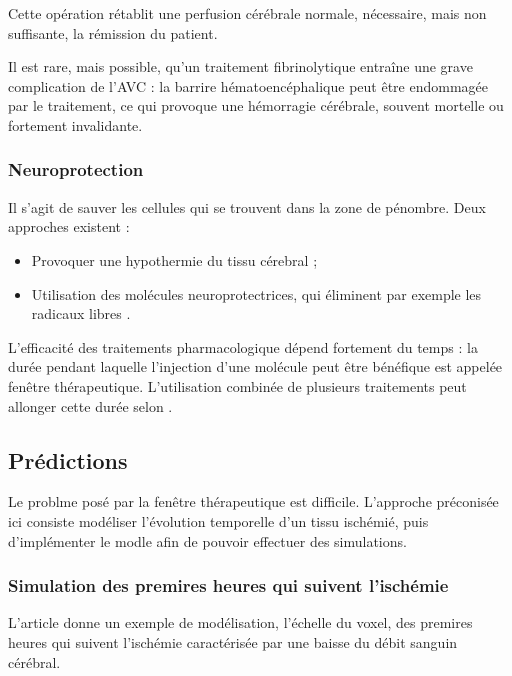 \par
Cette op\'eration r\'etablit une perfusion c\'er\'ebrale normale, n\'ecessaire, mais non suffisante,  la r\'emission du patient.

\etoile
Il est rare, mais possible, qu'un traitement fibrinolytique entra\^ine une grave complication de l'AVC : %
la barrire h\'ematoenc\'ephalique peut \^etre endommag\'ee par le traitement, ce qui provoque une h\'emorragie c\'er\'ebrale, %
souvent mortelle ou fortement invalidante.

\subsubsection{Neuroprotection}

Il s'agit de sauver les cellules qui se trouvent dans la zone de p\'enombre. Deux approches existent :
\begin{itemize}
\item Provoquer une hypothermie du tissu c\'erebral ;
\item Utilisation des mol\'ecules neuroprotectrices, qui \'eliminent par exemple les radicaux libres \cite{Durukan_PBB_07}.
\end{itemize}

L'efficacit\'e des traitements pharmacologique d\'epend fortement du temps : %
la dur\'ee pendant laquelle l'injection d'une mol\'ecule peut \^etre b\'en\'efique est appel\'ee fen\^etre th\'erapeutique. %
L'utilisation combin\'ee de plusieurs traitements peut allonger cette dur\'ee selon \cite{Durukan_PBB_07}.

\subsection{Pr\'edictions}

Le problme pos\'e par la fen\^etre th\'erapeutique est difficile. %
L'approche pr\'econis\'ee ici consiste  mod\'eliser l'\'evolution temporelle d'un tissu isch\'emi\'e, %
puis d'impl\'ementer le modle afin de pouvoir effectuer des simulations.

\subsubsection{Simulation des premires heures qui suivent l'isch\'emie}

L'article \cite{Duval_JCBFM_02} donne un exemple de mod\'elisation,  l'\'echelle du voxel, %
des premires heures qui suivent l'isch\'emie caract\'eris\'ee par une baisse du d\'ebit sanguin c\'er\'ebral.

